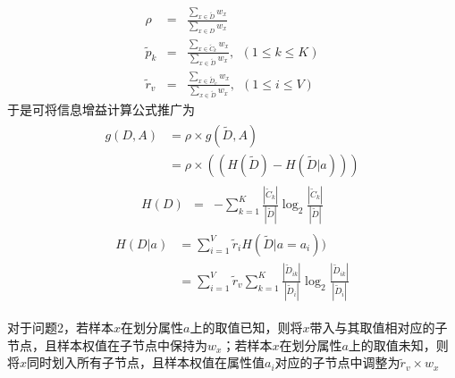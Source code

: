 \begin{eqnarray}
\rho&=&\frac{\sum_{x\in \tilde{D}}w_x}{\sum_{x\in D}w_x}\\
\tilde{p}_k&=&\frac{\sum_{x\in \tilde{C}_k}w_x}{\sum_{x\in \tilde{D}}w_x},\ \ (1\leq k \leq K) \\
\tilde{r}_v&=&\frac{\sum_{x\in \tilde{D}_v}w_x}{\sum_{x\in \tilde{D}}w_x},\ \ (1\leq i \leq V)
\end{eqnarray}
于是可将信息增益计算公式推广为
\begin{eqnarray}
\begin{aligned}
g(D,A) &= \rho\times g(\tilde{D},A)\\
&= \rho\times 
\left(
(H(\tilde{D})-H(\tilde{D}|a))
\right)
\end{aligned}
\end{eqnarray}
\begin{eqnarray}
H(D)&=&-\sum_{k=1}^K \frac{|\tilde{C}_k|}{|\tilde{D}|}\log_2\frac{|\tilde{C}_k|}{|\tilde{D}|}
\end{eqnarray}
\begin{eqnarray}
\begin{aligned}
H(D|a)&=\sum_{i=1}^V \tilde{r}_i H(\tilde{D}|a=a_i))\\
&=\sum_{i=1}^V \tilde{r}_v \sum_{k=1}^K\frac{|\tilde{D}_{ik}|}{|\tilde{D}_i|}\log_2\frac{|\tilde{D}
_{ik}|}{|\tilde{D}_i|}
\end{aligned}
\end{eqnarray}

对于问题2，若样本$x$在划分属性$a$上的取值已知，则将$x$带入与其取值相对应的子节点，且样本权值在子节点中保持为$w_x$；若样本$x$在划分属性$a$上的取值未知，则将$x$同时划入所有子节点，且样本权值在属性值$a_i$对应的子节点中调整为$\tilde{r}_v\times w_x$







